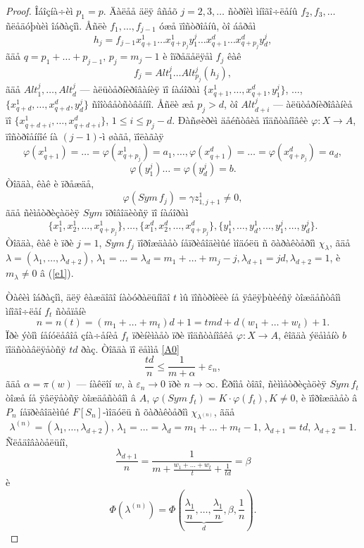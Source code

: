 \documentclass{article}
\numberwithin{equation}{section}
\theoremstyle{plain}
\theoremstyle{definition}
\newtheorem{proof}{Äîêàçàòåëüñòâî}
\begin{document}
\begin{fulltext}
\begin{proof}
Îáîçíà÷èì $p_1=p$. Äàëåå äëÿ  âñåõ $j=2,3,\ldots$ ñòðîèì ìíîãî÷ëåíû $f_2,f_3,\ldots$ ñëåäóþùèì
îáðàçîì. Åñëè $f_1,\ldots, f_{j-1}$ óæå ïîñòðîåíû, òî áåðåì
$$
h_j=f_{j-1}x^1_{q+1}\ldots x^1_{q+p_j}y_1^j\ldots
x^d_{q+1}\ldots x^d_{q+p_j}y_d^j,
$$
ãäå $q=p_1+\ldots +p_{j-1},\, p_j=m_j-1$ è îïðåäåëÿåì $f_j$ êàê
$$
f_j=Alt^j_1\ldots Alt^j_{p_j}(h_j),
$$
ãäå $Alt^j_1,\ldots ,Alt^j_d$ ---  àëüòåðíèðîâàíèÿ ïî íàáîðàì 
$\{x^1_{q+1},\ldots,x^d_{q+1}, y^j_1\}$, $\ldots$,\\ $\{x^1_{q+d},\ldots,x^d_{q+d}, y^j_d\}$ 
ñîîòâåòñòâåííî. Åñëè æå $p_j>d$, òî $Alt^j_{d+i}$ --- àëüòåðíèðîâàíèå ïî
$\{x^1_{q+d+i},\ldots,x^d_{q+d+i}\}$, $1\le i \le p_j-d$. Ðàñøèðèì äåéñòâèå ïîäñòàíîâêè
$\varphi: X\to A$, ïîñòðîåííîé íà $(j-1)$-ì øàãå, ïîëàãàÿ
$$
\varphi(x^1_{q+1})=\ldots= \varphi(x^1_{q+p_j})=a_1,\ldots,
\varphi(x^d_{q+1})=\ldots= \varphi(x^d_{q+p_j})=a_d,
$$
$$
\varphi(y^j_{1})\ldots= \varphi(y^j_d)=b.
$$
Òîãäà, êàê è ïðåæäå,
$$
\varphi(Sym\, f_j)=\gamma z^1_{1,j+1} \ne 0,
$$
ãäå ñèìåòðèçàöèÿ $Sym$ ïðîâîäèòñÿ ïî íàáîðàì
$$
\{x^1_1,x^1_2,\ldots,x^1_{q+p_j}\},\ldots,\{x^d_1,x^d_2,\ldots,x^d_{q+p_j}\},
\{y^1_1,\ldots,y^1_d,\ldots,y^j_1,\ldots, y^j_d\}.
$$
Òîãäà, êàê è ïðè $j=1$, $Sym\, f_j$ ïîðîæäàåò íåïðèâîäèìûé ìîäóëü ñ õàðàêòåðîì $\chi_\lambda$,
ãäå $\lambda=(\lambda_1,\ldots,\lambda_{d+2})$, $\lambda_1=\ldots= \lambda_d=m_1+\ldots+m_j-j,
\lambda_{d+1}=jd, \lambda_{d+2}=1$, è $m_\lambda\ne 0$ â (\ref{e1}).

Òàêèì îáðàçîì, äëÿ êàæäîãî íàòóðàëüíîãî $t$ ìû ïîñòðîèëè íå ÿâëÿþùèéñÿ òîæäåñòâîì 
ìíîãî÷ëåí $f_t$ ñòåïåíè
$$
n=n(t)=(m_1+\ldots+m_t)d+1=tmd+d(w_1+\ldots+w_t)+1.
$$
Ïðè ýòîì íåíóëåâîå çíà÷åíèå $f_t$ ïðèíèìàåò ïðè ïîäñòàíîâêå $\varphi: X\to A$, êîãäà
ýëåìåíò $b$ ïîäñòàâëÿåòñÿ $td$ ðàç. Òîãäà ïî ëåììå \ref{A0}
$$
\frac{td}{n} \le \frac{1}{m+\alpha}+\varepsilon_n,
$$
ãäå $\alpha=\pi(w)$ --- íàêëîí $w$, à $\varepsilon_n\to 0$  ïðè $n\to\infty$. Êðîìå òîãî,
ñèììåòðèçàöèÿ $Sym\, f_t$ òîæå íå ÿâëÿåòñÿ òîæäåñòâîì â $A$, $\varphi(Sym\, f_t)=
K\cdot\varphi(f_t), K\ne 0$, è ïîðîæäàåò â $P_n$ íåïðèâîäèìûé $F[S_n]$-ìîäóëü ñ õàðàêòåðîì
$\chi_{\lambda^{(n)}}$, ãäå
$$
\lambda^{(n)}=(\lambda_1,\ldots,\lambda_{d+2}),\,
\lambda_1=\ldots=\lambda_d=m_1+\ldots+m_t-1,\, \lambda_{d+1}=td,\, \lambda_{d+2}=1.
$$
Ñëåäîâàòåëüíî,
$$
\frac{\lambda_{d+1}}{n}=\frac{1}{m+\frac{w_1+\ldots+w_t}{t}+\frac{1}{td}}=\beta
$$
è
$$
\Phi(\lambda^{(n)})=
\Phi\left(\underbrace{\frac{\lambda_1}{n},\ldots,\frac{\lambda_1}{n}}_{d},\beta,\frac{1}{n}\right).
$$


\end{proof}
\end{fulltext}
\end{document}
